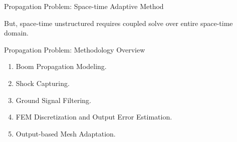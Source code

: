 \documentclass{beamer}
\newcounter{sectionframecount}
\begin{document}


\begin{frame}[t]{Propagation Problem: Space-time Adaptive Method}


\begin{minipage}[t]{1\linewidth}
  \vspace{4.8cm}
  But, space-time unstructured requires coupled solve over entire space-time domain.
\end{minipage}

\end{frame}



\begin{frame}[t]{Propagation Problem: Methodology Overview}
  \vspace{20pt}
  \begin{minipage}[t]{1\linewidth}
    \begin{enumerate}
      \item Boom Propagation Modeling.
      \vspace{10pt}
      \item Shock Capturing.
      \vspace{10pt}
      \item Ground Signal Filtering.
      \vspace{10pt}
      \item FEM Discretization and Output Error Estimation.
      \vspace{10pt}
      \item Output-based Mesh Adaptation.
    \end{enumerate}

  \end{minipage}
\end{frame}
\end{document}
